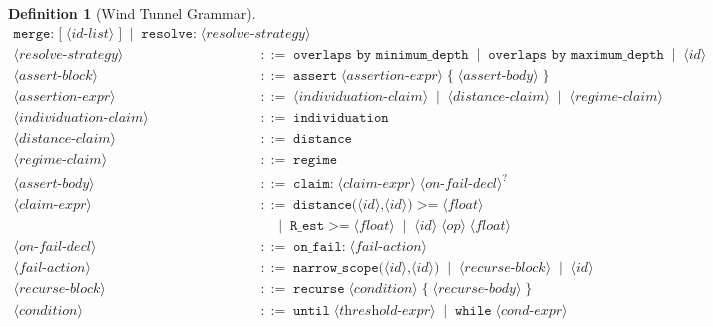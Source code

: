 \documentclass[12pt,a4paper,twocolumn]{article}
\theoremstyle{plain}
\theoremstyle{definition}
\newtheorem{definition}[theorem]{Definition}
\theoremstyle{remark}
\begin{document}
\begin{definition}[Wind Tunnel Grammar]
\begin{align*}
  \texttt{merge:}\;\texttt{[}\;\langle\textit{id-list}\rangle\;\texttt{]}
  \;\mid\; \texttt{resolve:}\;\langle\textit{resolve-strategy}\rangle \\
\langle\textit{resolve-strategy}\rangle &\;::=\;
  \texttt{overlaps by minimum\_depth}
  \;\mid\; \texttt{overlaps by maximum\_depth}
  \;\mid\; \langle\textit{id}\rangle \\[4pt]
\langle\textit{assert-block}\rangle &\;::=\;
  \texttt{assert}\;\langle\textit{assertion-expr}\rangle\;\texttt{\{}\;
  \langle\textit{assert-body}\rangle\;\texttt{\}} \\
\langle\textit{assertion-expr}\rangle &\;::=\;
  \langle\textit{individuation-claim}\rangle
  \;\mid\; \langle\textit{distance-claim}\rangle
  \;\mid\; \langle\textit{regime-claim}\rangle \\
\langle\textit{individuation-claim}\rangle &\;::=\;
  \texttt{individuation} \\
\langle\textit{distance-claim}\rangle &\;::=\;
  \texttt{distance} \\
\langle\textit{regime-claim}\rangle &\;::=\;
  \texttt{regime} \\
\langle\textit{assert-body}\rangle &\;::=\;
  \texttt{claim:}\;\langle\textit{claim-expr}\rangle
  \;\langle\textit{on-fail-decl}\rangle^? \\
\langle\textit{claim-expr}\rangle &\;::=\;
  \texttt{distance(}\langle\textit{id}\rangle\texttt{,}\langle\textit{id}\rangle\texttt{)}\;
  \texttt{>=}\;\langle\textit{float}\rangle \\
  &\quad\;\mid\; \texttt{R\_est}\;\texttt{>=}\;\langle\textit{float}\rangle
  \;\mid\; \langle\textit{id}\rangle\;\langle\textit{op}\rangle\;\langle\textit{float}\rangle \\
\langle\textit{on-fail-decl}\rangle &\;::=\;
  \texttt{on\_fail:}\;\langle\textit{fail-action}\rangle \\
\langle\textit{fail-action}\rangle &\;::=\;
  \texttt{narrow\_scope(}\langle\textit{id}\rangle\texttt{,}\langle\textit{id}\rangle\texttt{)}
  \;\mid\; \langle\textit{recurse-block}\rangle
  \;\mid\; \langle\textit{id}\rangle \\[4pt]
\langle\textit{recurse-block}\rangle &\;::=\;
  \texttt{recurse}\;\langle\textit{condition}\rangle\;\texttt{\{}\;
  \langle\textit{recurse-body}\rangle\;\texttt{\}} \\
\langle\textit{condition}\rangle &\;::=\;
  \texttt{until}\;\langle\textit{threshold-expr}\rangle
  \;\mid\; \texttt{while}\;\langle\textit{cond-expr}\rangle \\

\end{align*}
\end{definition}
\end{document}
